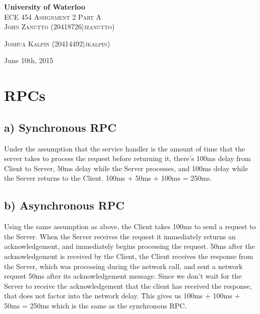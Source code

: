 \documentclass[12pt]{article}
\date{}
\begin{document}
\def\question#1{\item[\bf #1.]}
\def\part#1{\item[\bf#1)]}
\newcommand{\pc}[1]{\mbox{\textbf{#1}}} %
\newcommand{\duedate}{June 10th, 2015}
\begin{titlepage}
\vspace*{\fill}
\textbf{\LARGE University of Waterloo}\\[1.5cm]

\textsc{\Large ECE 454 Assignment 2 Part A}\\[0.5cm]

\textsc{John Zanutto (20418726|jzanutto)}

\textsc{Joshua Kalpin (20414492|jkalpin)}

\duedate
\vspace*{\fill}
\end{titlepage}
\section{RPCs}
\subsection*{a) Synchronous RPC}
Under the assumption that the service handler is the amount of time that the server takes to process the request before returning it, there's 100ms delay from Client to Server, 50ms delay while the Server processes, and 100ms delay while the Server returns to the Client. 100ms + 50ms + 100ms = 250ms.
\subsection*{b) Asynchronous RPC}
Using the same assumption as above, the Client takes 100ms to send a request to the Server. When the Server receives the request it immediately returns an acknowledgement, and immediately begins processing the request. 50ms after the acknowledgement is received by the Client, the Client receives the response from the Server, which was processing during the network call, and sent a network request 50ms after its acknowledgement message.  Since we don't wait for the Server to receive the acknowledgement that the client has received the response, that does not factor into the network delay. This gives us 100ms + 100ms + 50ms = 250ms which is the same as the synchronous RPC.
\end{document}
